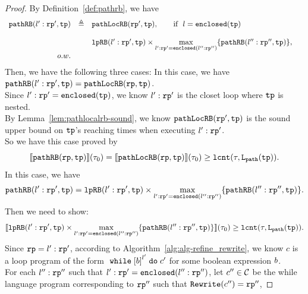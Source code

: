 \begin{proof}
By Definition~\ref{def:pathrb}, we have 
\[  
  \begin{array}{rcll}
  \mathtt{pathRB}(l': \mathtt{rp}', \mathtt{tp}) & \triangleq & 
  { \mathtt{pathLocRB}(\mathtt{rp}', \mathtt{tp})}, \qquad \text{if }~ l = \mathtt{enclosed}(\mathtt{tp}) & \\
  \\ &  & 
  { 
    \mathtt{lpRB}(l':\mathtt{rp}', \mathtt{tp} )
  \times \max\limits_{l': \mathtt{rp}' = \mathtt{enclosed}(l'':\mathtt{rp}'')}
  \{\mathtt{pathRB}(l'':\mathtt{rp}'', \mathtt{tp})\} },&\\
   ~~ o.w. &\\
  \end{array}
\]
%
Then, we have the following three cases:
In this case, we have $\mathtt{pathRB}(l': \mathtt{rp}', \mathtt{tp}) = {\mathtt{pathLocRB}(\mathtt{rp}, \mathtt{tp})}$.
\\
Since $l': \mathtt{rp}' = \mathtt{enclosed}(\mathtt{tp})$, we know $l': \mathtt{rp}'$ is the closet loop where $\mathtt{tp}$ is nested.
\\
By Lemma~\ref{lem:pathlocalrb-sound}, we know $\mathtt{pathLocRB}(\mathtt{rp}', \mathtt{tp})$ is the
sound upper bound on $\mathtt{tp}$'s reaching times when executing $l': \mathtt{rp}'$. 
\\
So we have this case proved by
\[
  \llbracket \mathtt{pathRB}(\mathtt{rp}, \mathtt{tp}) \rrbracket(\mathtt{\tau}_0) = \llbracket \mathtt{pathLocRB}(\mathtt{rp}, \mathtt{tp}) \rrbracket(\mathtt{\tau}_0) \geq \mathtt{lcnt}(\mathtt{\tau}, \mathtt{L}_{\mathtt{path}}(\mathtt{tp})).
\]
%
In this case, we have 
\[
  \mathtt{pathRB}(l': \mathtt{rp}', \mathtt{tp}) = \mathtt{lpRB}(l':\mathtt{rp}', \mathtt{tp} )
  \times \max\limits_{l': \mathtt{rp}' = \mathtt{enclosed}(l'':\mathtt{rp}'')}
  \{\mathtt{pathRB}(l'':\mathtt{rp}'', \mathtt{tp})\}.
\]
Then we need to show:
\[
  \llbracket \mathtt{lpRB}(l':\mathtt{rp}', \mathtt{tp} )
  \times \max\limits_{l': \mathtt{rp}' = \mathtt{enclosed}(l'':\mathtt{rp}'')}
  \{\mathtt{pathRB}(l'':\mathtt{rp}'', \mathtt{tp})\} \rrbracket(\mathtt{\tau}_0) 
  \geq \mathtt{lcnt}(\mathtt{\tau}, \mathtt{L}_{\mathtt{path}}(\mathtt{tp})).
  \]
%
Since $\mathtt{rp} = l': \mathtt{rp}'$, according to Algorithm~\ref{alg:alg-refine_rewrite}, we know $c$ is a loop program of the form
$\ewhile \clabel{\bexpr}^{l'} \edo c'$ for some boolean expression $b$.
\\
For each $l'':\mathtt{rp}''$ such that $l': \mathtt{rp}' = \mathtt{enclosed}(l'':\mathtt{rp}'')$, 
let $c''\in \mathcal{C}$ be the while language program corresponding to $\mathtt{rp}''$ such that $\mathtt{Rewrite}(c'') = \mathtt{rp}''$,

\end{proof}
